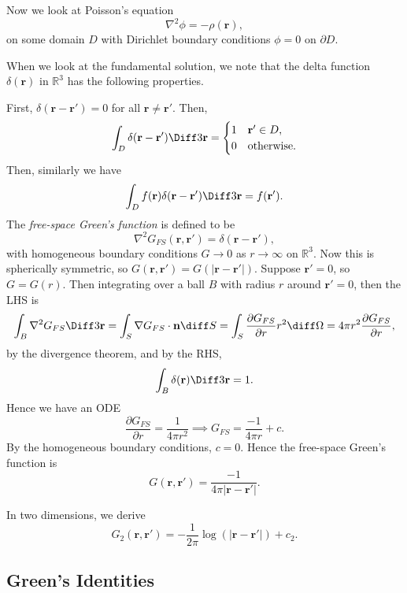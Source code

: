 \documentclass[12pt]{article}
\begin{document}
Now we look at Poisson's equation
\[
	\nabla^2 \phi = - \rho(\mathbf{r})
,\]
on some domain $D$ with Dirichlet boundary conditions $\phi = 0$ on $\partial D$.

When we look at the fundamental solution, we note that the delta function $\delta(\mathbf{r})$ in $\mathbb{R}^3$ has the following properties.

First, $\delta(\mathbf{r} - \mathbf{r}') = 0$ for all $\mathbf{r} \neq \mathbf{r}'$. Then,
\[
	\int_{D}\delta(\mathbf{r} - \mathbf{r}') \Diff3 \mathbf{r} = 
	\begin{cases}
		1 & \mathbf{r}' \in D, \\
		0 & \text{otherwise}.
	\end{cases}
\]
Then, similarly we have
\[
	\int_{D}f(\mathbf{r})\delta(\mathbf{r} - \mathbf{r}')\Diff3 \mathbf{r} = f(\mathbf{r}')
.\]
The \textit{free-space Green's function} is defined to be
\[
	\nabla^2 G_{FS}(\mathbf{r}, \mathbf{r}') = \delta(\mathbf{r} - \mathbf{r}')
,\]
with homogeneous boundary conditions $G \to 0$ as $r \to \infty$ on $\mathbb{R}^3$. Now this is spherically symmetric, so $G(\mathbf{r}, \mathbf{r}') = G(|\mathbf{r} - \mathbf{r}'|)$. Suppose $\mathbf{r}' = 0$, so $G = G(r)$. Then integrating over a ball $B$ with radius $r$ around $\mathbf{r}' = 0$, then the LHS is
\[
\int_{B}\nabla^2 G_{FS} \Diff3 \mathbf{r} = \int_{S} \nabla G_{FS} \cdot \mathbf{n} \diff S = \int_{S} \frac{\partial G_{FS}}{\partial r} r^2 \diff \Omega = 4\pi r^2 \frac{\partial G_{FS}}{\partial r}
,\]
by the divergence theorem, and by the RHS,
\[
	\int_{B}\delta(\mathbf{r})\Diff3 \mathbf{r} = 1
.\]
Hence we have an ODE
\[
\frac{\partial G_{FS}}{\partial r} = \frac{1}{4 \pi r^2} \implies G_{FS} = \frac{-1}{4 \pi r} + c
.\]
By the homogeneous boundary conditions, $c = 0$. Hence the free-space Green's function is
\[
	G(\mathbf{r}, \mathbf{r}') = \frac{-1}{4\pi|\mathbf{r} - \mathbf{r}'|}
.\]

In two dimensions, we derive
\[
	G_2(\mathbf{r}, \mathbf{r}') = - \frac{1}{2\pi} \log(|\mathbf{r} - \mathbf{r}'|) + c_2
.\] 

\subsection{Green's Identities}%
\label{sub:green_s_identities}
\end{document}
